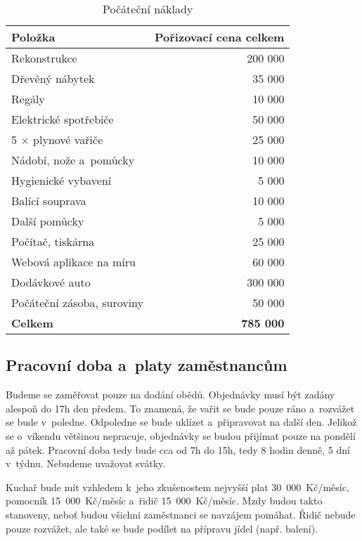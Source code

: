 \begin{table}[htbp]
\begin{center}
\begin{tabular}{ l r }

\textbf{Položka}&\textbf{Pořizovací cena celkem} \\ \hline 
Rekonstrukce & 200 000 \\ 
Dřevěný nábytek & 35 000 \\ 
Regály & 10 000 \\ 
Elektrické spotřebiče & 50 000 \\ 
5 $\times$ plynové vařiče & 25 000 \\ 
Nádobí, nože a~pomůcky & 10 000 \\ 
Hygienické vybavení & 5 000 \\ 
Balící souprava & 10 000 \\ 
Další pomůcky & 5 000 \\ 
Počítač, tiskárna & 25 000 \\ 
Webová aplikace na míru & 60 000 \\ 
Dodávkové auto & 300 000 \\ 
Počáteční zásoba, suroviny & 50 000 \\ \hline 
\textbf{Celkem} & \textbf{785 000} \\

\end{tabular}
\caption{Počáteční náklady}
\label{pocatecni_naklady}
\end{center}
\end{table}

\subsection{Pracovní doba a~platy zaměstnancům}
Budeme se zaměřovat pouze na dodání obědů. Objednávky musí být zadány alespoň do 17h den předem. To znamená, že vařit se bude pouze ráno a~rozvážet se bude v~poledne. Odpoledne se bude uklízet a~připravovat na další den. Jelikož se o~víkendu většinou nepracuje, objednávky se budou přijímat pouze na pondělí až pátek. Pracovní doba tedy bude cca od 7h do 15h, tedy 8 hodin denně, 5 dní v~týdnu. Nebudeme uvažovat svátky.

Kuchař bude mít vzhledem k~jeho zkušenostem nejvyšší plat 30~000~Kč/měsíc, pomocník 15~000~Kč/měsíc a~řidič 15~000~Kč/měsíc. Mzdy budou takto stanoveny, neboť budou všichni zaměstnanci se navzájem pomáhat. Řidič nebude pouze rozvážet, ale také se bude podílet na přípravu jídel (např. balení).





